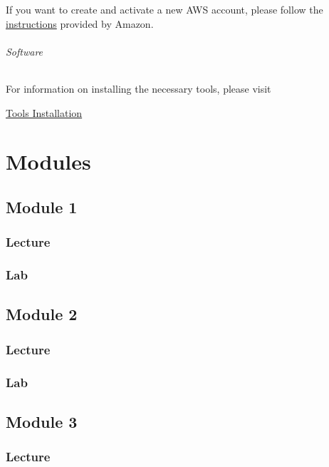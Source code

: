 \documentclass[
]{book}
\begin{document}
If you want to create and activate a new AWS account, please follow the \href{https://aws.amazon.com/premiumsupport/knowledge-center/create-and-activate-aws-account/}{instructions} provided by Amazon.

\paragraph{Software}\label{software}

For information on installing the necessary tools, please visit

\href{tool-installation.rmd}{Tools Installation}

\part{Modules}\label{part-modules}

\chapter{Module 1}\label{module-1}

\section{Lecture}\label{lecture}

\section{Lab}\label{lab}

\chapter{Module 2}\label{module-2}

\section{Lecture}\label{lecture-1}

\section{Lab}\label{lab-1}

\chapter{Module 3}\label{module-3}

\section{Lecture}\label{lecture-2}
\end{document}
